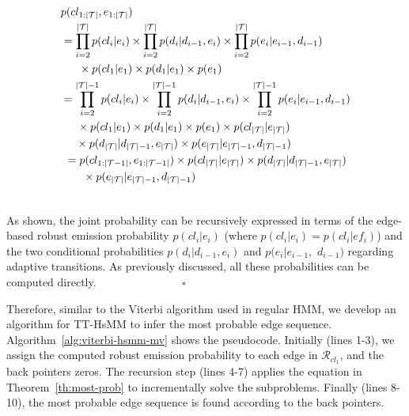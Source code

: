 \documentclass{vldb}
\begin{document}
	\begin{equation*}
	\begin{multlined}
	p(cl_{1:|\mathcal{T}|}, e_{1:|\mathcal{T}|})\\
	\hspace{-25pt}=\prod_{i=2}^{|\mathcal{T}|}p(cl_i|e_i)\times \prod_{i=2}^{|\mathcal{T}|} p(d_i|d_{i-1},e_i)\times
	\prod_{i=2}^{|\mathcal{T}|} p(e_i|e_{i-1},d_{i-1})\\
	\hspace{-100pt}\times p(cl_1|e_1)\times p(d_1|e_1)\times p(e_1)\\
	=\prod_{i=2}^{|\mathcal{T}|-1}p(cl_i|e_i)\times \prod_{i=2}^{|\mathcal{T}|-1} p(d_i|d_{i-1},e_i)\times
	\prod_{i=2}^{|\mathcal{T}|-1} p(e_i|e_{i-1},d_{i-1})\\
	\hspace{-40pt}
	\times p(cl_1|e_1)\times p(d_1|e_1)\times p(e_1)\times p(cl_{|\mathcal{T}|}|e_{|\mathcal{T}|}) \\ 
	\hspace{-40pt} \times p(d_{|\mathcal{T}|}|d_{|\mathcal{T}|-1},e_{|\mathcal{T}|})\times %
	p(e_{|\mathcal{T}|}|e_{|\mathcal{T}|-1},d_{|\mathcal{T}|-1})\\
	=p(cl_{1:|\mathcal{T}-1|},e_{1:|\mathcal{T}-1|})\times
	p(cl_{|\mathcal{T}|}|e_{|\mathcal{T}|})\times p(d_{|\mathcal{T}|}|d_{|\mathcal{T}|-1},e_{|\mathcal{T}|})\\ \hspace{-120pt}\times p(e_{|\mathcal{T}|}|e_{|\mathcal{T}|-1},d_{|\mathcal{T}|-1})\\
	\end{multlined}
	\end{equation*}
	
	As shown, the joint probability can be recursively expressed in terms of the edge-based robust emission probability $p(cl_{i}|e_i)$ (where $p(cl_{i}|e_i)=p(cl_i|ef_i)$) and the two conditional probabilities $p(d_i|d_{i-1},e_i)$ and $p(e_i|e_{i-1},$ $d_{i-1})$ regarding adaptive transitions.
	As previously discussed, all these probabilities can be computed directly.$~~~~~~~~~~~~~~~~~~~~~~~~~~~~~~~~~~~\square$
	
	Therefore, similar to the Viterbi algorithm used in regular HMM, we develop an algorithm for TT-HsMM to infer the most probable edge sequence. 	Algorithm~\ref{alg:viterbi-hsmm-mv} shows the pseudocode.
	Initially (lines 1-3), we assign the computed robust emission probability to each edge in $\mathcal{R}_{cl_1}$,
	and the back pointers zeros. 
	The recursion step (lines 4-7) applies the equation in Theorem~\ref{th:most-prob} to incrementally solve the subproblems.
	Finally (lines 8-10), the most probable edge sequence is found according to the  back pointers.
	
\end{document}
